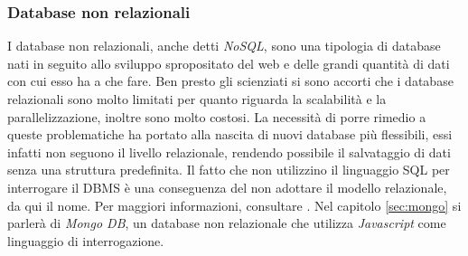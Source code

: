 \subsubsection{Database non relazionali}\label{sec:dbnonrel}
I database non relazionali, anche detti \emph{NoSQL}, sono una tipologia di database nati in seguito allo sviluppo spropositato del web e delle grandi quantità di dati con cui esso ha a che fare. Ben presto gli scienziati si sono accorti che i database relazionali sono molto limitati per quanto riguarda la scalabilità e la parallelizzazione, inoltre sono molto costosi. La necessità di porre rimedio a queste problematiche ha portato alla nascita di nuovi database più flessibili, essi infatti non seguono il livello relazionale, rendendo possibile il salvataggio di dati senza una struttura predefinita. Il fatto che non utilizzino il linguaggio SQL per interrogare il DBMS è una conseguenza del non adottare il modello relazionale, da qui il nome. Per maggiori informazioni, consultare \cite{nosql}. Nel capitolo \ref{sec:mongo} si parlerà di \emph{Mongo DB}, un database non relazionale che utilizza \emph{Javascript} come linguaggio di interrogazione.
 
